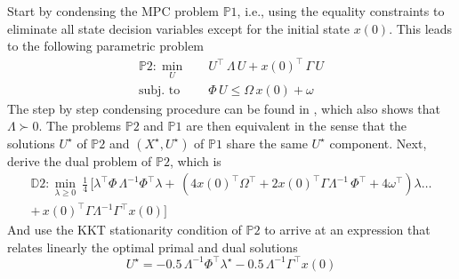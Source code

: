 Start by condensing the MPC problem $\mathds{P}1$, i.e., using the equality constraints to eliminate all state decision variables except for the initial state $x(0)$. This leads to the following parametric problem
\begin{subequations}
	\begin{align}
		\mathds{P}2: \min_{U} \quad & U^\top \, \Lambda \, U + x(0)^\top \, \Gamma \, U\\
		\text{subj. to} \quad & \Phi \, U \leq  \Omega \, x(0) + \omega \label{eq:constr}
	\end{align}
\end{subequations}
The step by step condensing procedure can be found in \cite{wright2019efficient}, which also shows that $\Lambda \succ 0$. The problems $\mathds{P}2$ and $\mathds{P}1$ are then equivalent in the sense that the solutions $U^\star$ of $\mathds{P}2$ and $(X^\star,U^\star)$ of $\mathds{P}1$ share the same $U^\star$ component. Next, derive the dual problem of $\mathds{P}2$, which is
\begin{equation}
	\begin{split} 
		\label{eq:dualMPC} 
		\mathds{D}2: \min_{\lambda \geq 0} \ \frac{1}{4} \, \big[ \lambda^\top\Phi \, \Lambda^{-1}\Phi^\top\lambda + \, (4 x(0)^\top\Omega^\top+2 x(0)^\top\Gamma \Lambda^{-1} \, \Phi^\top + 4 \omega^\top)\lambda \dots \\
		+ \, x(0)^\top\Gamma \Lambda^{-1} \Gamma^\top x(0) \big]
	\end{split}
\end{equation}
And use the KKT stationarity condition of $\mathds{P}2$ to arrive at an expression that relates linearly the optimal primal and dual solutions
\begin{equation}
	\label{eq:stationarity}
	U^\star = -0.5 \, \Lambda^{-1}\Phi^\top \lambda^{\star} -0.5 \, \Lambda^{-1} \Gamma^\top x(0)
\end{equation}
